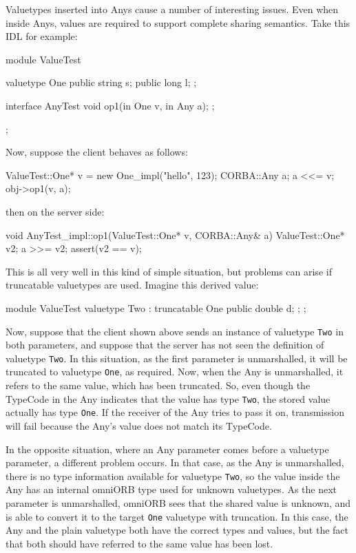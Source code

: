 \documentclass[11pt,oneside,a4paper]{book}
\newcommand{\type}[1]{\texttt{#1}}
\begin{document}
Valuetypes inserted into Anys cause a number of interesting issues.
Even when inside Anys, values are required to support complete sharing
semantics. Take this IDL for example:

\begin{idllisting}
module ValueTest {
  valuetype One {
    public string s;
    public long   l;
  };

  interface AnyTest {
    void op1(in One v, in Any a);
  };
};
\end{idllisting}

\noindent Now, suppose the client behaves as follows:

\begin{cxxlisting}
ValueTest::One* v = new One_impl("hello", 123);
CORBA::Any a;
a <<= v;
obj->op1(v, a);
\end{cxxlisting}

\noindent then on the server side:

\begin{cxxlisting}
void AnyTest_impl::op1(ValueTest::One* v, CORBA::Any& a)
{
  ValueTest::One* v2;
  a >>= v2;
  assert(v2 == v);
}
\end{cxxlisting}

\noindent
This is all very well in this kind of simple situation, but problems
can arise if truncatable valuetypes are used. Imagine this derived
value:

\begin{idllisting}
module ValueTest {
  valuetype Two : truncatable One {
    public double d;
  };
};
\end{idllisting}

\noindent
Now, suppose that the client shown above sends an instance of
valuetype \type{Two} in both parameters, and suppose that the server
has not seen the definition of valuetype \type{Two}. In this
situation, as the first parameter is unmarshalled, it will be
truncated to valuetype \type{One}, as required. Now, when the Any is
unmarshalled, it refers to the same value, which has been truncated.
So, even though the TypeCode in the Any indicates that the value has
type \type{Two}, the stored value actually has type \type{One}. If the
receiver of the Any tries to pass it on, transmission will fail
because the Any's value does not match its TypeCode.

In the opposite situation, where an Any parameter comes before a
valuetype parameter, a different problem occurs. In that case, as the
Any is unmarshalled, there is no type information available for
valuetype \type{Two}, so the value inside the Any has an internal
omniORB type used for unknown valuetypes. As the next parameter is
unmarshalled, omniORB sees that the shared value is unknown, and is
able to convert it to the target \type{One} valuetype with
truncation. In this case, the Any and the plain valuetype both have
the correct types and values, but the fact that both should have
referred to the same value has been lost.
\end{document}
